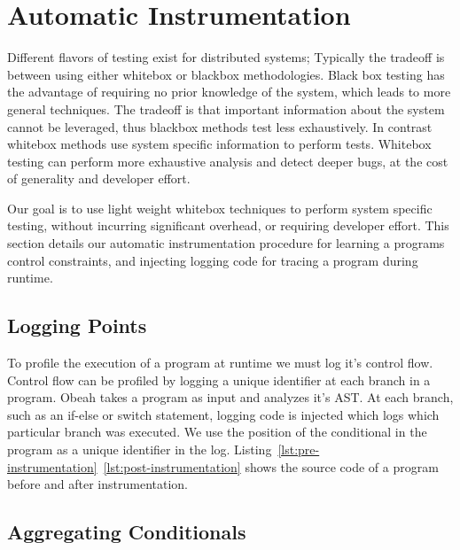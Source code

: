 \section{Automatic Instrumentation}
\label{sec:instrumentation}



Different flavors of testing exist for distributed systems; Typically the
tradeoff is between using either whitebox or blackbox methodologies. Black box
testing has the advantage of requiring no prior knowledge of the system, which
leads to more general techniques. The tradeoff is that important information
about the system cannot be leveraged, thus blackbox methods test less
exhaustively. In contrast whitebox methods use system specific information to
perform tests. Whitebox testing can perform more exhaustive analysis and detect
deeper bugs, at the cost of generality and developer effort. 

Our goal is to use light weight whitebox techniques to perform system specific
testing, without incurring significant overhead, or requiring developer effort.
This section details our automatic instrumentation procedure for learning a
programs control constraints, and injecting logging code for tracing a program
during runtime.

\subsection{Logging Points}

To profile the execution of a program at runtime we must log it's control flow.
Control flow can be profiled by logging a unique identifier at each branch in a
program. Obeah takes a program as input and analyzes it's AST.  At each branch,
such as an if-else or switch statement, logging code is injected which logs
which particular branch was executed. We use the position of the conditional in
the program as a unique identifier in the log.
Listing~\ref{lst:pre-instrumentation}~\ref{lst:post-instrumentation} shows the
source code of a program before and after instrumentation.

\subsection{Aggregating Conditionals}

